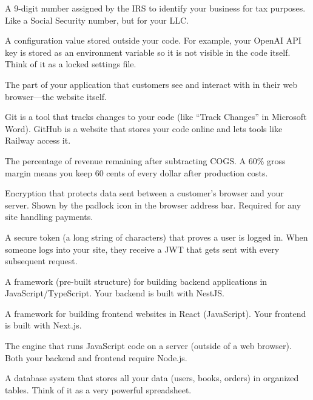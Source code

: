\documentclass[12pt, letterpaper, oneside]{book}
\begin{document}
\begin{description}[style=nextline, leftmargin=2em, itemsep=6pt]
\item[EIN (Employer Identification Number)]
A 9-digit number assigned by the IRS to identify your business for tax purposes. Like a Social Security number, but for your LLC.

\item[Environment Variable]
A configuration value stored outside your code. For example, your OpenAI API key is stored as an environment variable so it is not visible in the code itself. Think of it as a locked settings file.

\item[Frontend]
The part of your application that customers see and interact with in their web browser---the website itself.

\item[Git / GitHub]
Git is a tool that tracks changes to your code (like ``Track Changes'' in Microsoft Word). GitHub is a website that stores your code online and lets tools like Railway access it.

\item[Gross Margin]
The percentage of revenue remaining after subtracting COGS. A 60\% gross margin means you keep 60 cents of every dollar after production costs.

\item[HTTPS / SSL / TLS]
Encryption that protects data sent between a customer's browser and your server. Shown by the padlock icon in the browser address bar. Required for any site handling payments.

\item[JWT (JSON Web Token)]
A secure token (a long string of characters) that proves a user is logged in. When someone logs into your site, they receive a JWT that gets sent with every subsequent request.

\item[NestJS]
A framework (pre-built structure) for building backend applications in JavaScript/TypeScript. Your backend is built with NestJS.

\item[Next.js]
A framework for building frontend websites in React (JavaScript). Your frontend is built with Next.js.

\item[Node.js]
The engine that runs JavaScript code on a server (outside of a web browser). Both your backend and frontend require Node.js.

\item[PostgreSQL]
A database system that stores all your data (users, books, orders) in organized tables. Think of it as a very powerful spreadsheet.


\end{description}
\end{document}
